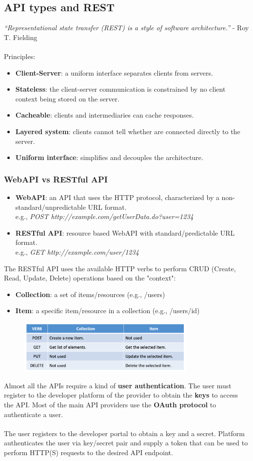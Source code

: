 \documentclass[10pt,a4paper]{article}
\newcommand{\nline}{\\~\\}
\begin{document}
 \subsection{API types and REST}
\textit{“Representational state transfer (REST) is a style of software architecture.”} - Roy T. Fielding \nline
Principles:
\begin{itemize}
	\item \textbf{Client-Server}: a uniform interface separates clients from servers.
	\item \textbf{Stateless}: the client-server communication is constrained by no client context being stored on the server.
	\item \textbf{Cacheable}: clients and intermediaries can cache responses.
	\item \textbf{Layered system}: clients cannot tell whether are connected directly to the server.
	\item \textbf{Uniform interface}: simplifies and decouples the architecture.
\end{itemize}
\subsubsection{WebAPI vs RESTful API}
\begin{itemize}
	\item \textbf{WebAPI}: an API that uses the HTTP protocol, characterized by a non-standard/unpredictable URL format. \\
	e.g., \textit{POST http://example.com/getUserData.do?user=1234}
	\item \textbf{RESTful API}: resource based WebAPI with standard/predictable URL format. \\
	e.g., \textit{GET http://example.com/user/1234}
\end{itemize}
The RESTful API uses the available HTTP verbs to perform CRUD (Create, Read, Update, Delete) operations based on the "context":
\begin{itemize}
	\item \textbf{Collection}: a set of items/resources (e.g., /users)
	\item \textbf{Item}: a specific item/resource in a collection (e.g., /users/{id})
\end{itemize}
 \begin{figure}[ht!]
 \hfill \includegraphics[width=250pt]{images/rest-crud}
 \hspace*{\fill}
 \end{figure}
 Almost all the APIs require a kind of \textbf{user authentication}. The user must register to the developer platform of the provider to obtain the \textbf{keys} to access the API. Most of the main API providers use the \textbf{OAuth protocol} to authenticate a user. \nline
 The user registers to the developer portal to obtain a key and a secret. Platform authenticates the user via key/secret pair and supply a token that can be used to perform HTTP(S) requests to the desired API endpoint.
\end{document}
